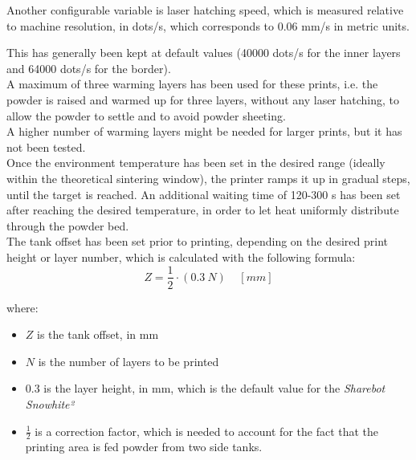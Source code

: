 \documentclass{article}
\begin{document}
          Another configurable variable is laser hatching speed, which is measured relative to machine resolution, in dots/s, 
          which corresponds to 0.06 mm/s in metric units. 
  
          This has generally been kept at default values (40000 dots/s for the inner layers and 64000 dots/s for the border).  \\ 
  
          A maximum of three warming layers has been used for these prints, i.e. the powder is raised and warmed 
          up for three layers, without any laser hatching, to allow the powder to settle and to avoid 
          powder sheeting. \\ 
          A higher number of warming layers might be needed for larger prints, but it has not been tested. \\
  
          Once the environment temperature has been set in the desired range (ideally within the theoretical 
          sintering window), the printer ramps it up in gradual steps, until the target is reached.  
          An additional waiting time of 120-300 s has been set after reaching the desired temperature, in order to let heat 
          uniformly distribute through the powder bed. \\
  
          The tank offset has been set prior to printing, depending on the desired print height or 
          layer number, which is calculated with the following formula: \\
          
          \begin{equation}
              Z =  \frac{1}{2} \cdot (0.3 \  N) \ \ \ \ \  [mm]
              \label{eq:layer_height}
          \end{equation}
          
          
          where:
          \begin{itemize}
              \item $Z$ is the tank offset, in mm
              \item $N$ is the number of layers to be printed 
              \item $0.3$ is the layer height, in mm, which is the default value for the \textit{Sharebot Snowhite²}
              \item $\frac{1}{2}$ is a correction factor, which is needed to account for the fact that the printing area is fed powder 
              from two side tanks.
          \end{itemize}
\end{document}
